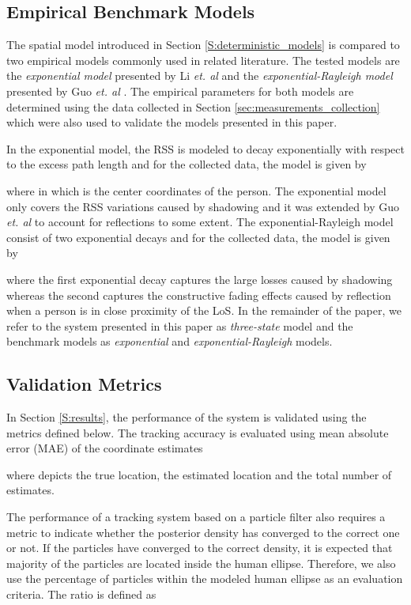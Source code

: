 \documentclass[journal, 10pt, twocolumn, balance]{IEEEtran}
\begin{document}
\subsection{Empirical Benchmark Models}

The spatial model introduced in Section \ref{S:deterministic_models} is compared to two empirical models commonly used in related literature. The tested models are the \emph{exponential model} presented by Li \emph{et. al} \cite{li2011} and the \emph{exponential-Rayleigh model} presented by Guo \emph{et. al} \cite{Guo2013}. The empirical parameters for both models are determined using the data collected in Section \ref{sec:measurements_collection} which were also used to validate the models presented in this paper. 


In the exponential model, the RSS is modeled to decay exponentially with respect to the excess path length  and for the collected data, the model is given by

where  in which  is the center coordinates of the person. The exponential model only covers the RSS variations caused by shadowing and it was extended by Guo \emph{et. al} \cite{Guo2013} to account for reflections to some extent. The exponential-Rayleigh model consist of two exponential decays and for the collected data, the model is given by 

where the first exponential decay captures the large losses caused by shadowing whereas the second captures the constructive fading effects caused by reflection when a person is in close proximity of the LoS. In the remainder of the paper, we refer to the system presented in this paper as \emph{three-state} model and the benchmark models as \emph{exponential} and \emph{exponential-Rayleigh} models.



\subsection{Validation Metrics}

In Section \ref{S:results}, the performance of the system is validated using the metrics defined below. The tracking accuracy is evaluated using mean absolute error (MAE) of the coordinate estimates 

where  depicts the true location,  the estimated location and  the total number of estimates. 

The performance of a tracking system based on a particle filter also requires a metric to indicate whether the posterior density has converged to the correct one or not. If the particles have converged to the correct density, it is expected that majority of the particles are located inside the human ellipse. Therefore, we also use the percentage of particles within the modeled human ellipse as an evaluation criteria. The ratio is defined as 
\end{document}
